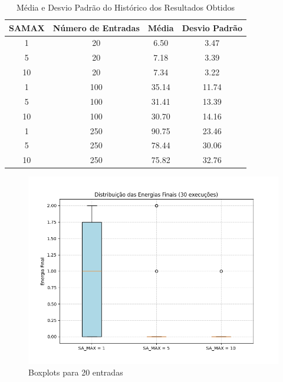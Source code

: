 \documentclass[12pt]{article}
\begin{document}
\begin{table}[H]
  \centering
  \caption{Média e Desvio Padrão do Histórico dos Resultados Obtidos}
  \begin{tabular}{|c|c|c|c|}
    \hline
    \textbf{SAMAX} & \textbf{Número de Entradas} & \textbf{Média} & \textbf{Desvio Padrão} \\ \hline
    1   & 20 & 6.50 & 3.47 \\ \hline
    5   & 20 & 7.18 & 3.39 \\ \hline
    10  & 20 & 7.34 & 3.22 \\ \hline
    1   & 100 & 35.14 & 11.74 \\ \hline
    5   & 100 & 31.41 & 13.39 \\ \hline
    10  & 100 & 30.70 & 14.16 \\ \hline
    1   & 250 & 90.75 & 23.46 \\ \hline
    5   & 250 & 78.44 & 30.06 \\ \hline
    10  & 250 & 75.82 & 32.76 \\ \hline
  
  \end{tabular}
  \label{tab:resultados}
  \end{table}


\begin{figure}[H]
  \centering
  \includegraphics[width=.9\textwidth]{imgs/boxplot_20.png}
  \caption{Boxplots para 20 entradas}
  \label{fig:boxplot20}
  \end{figure}
\end{document}
